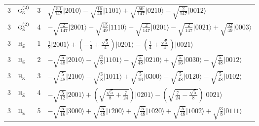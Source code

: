 \documentclass[11pt]{article}
\newcommand{\irr}[1]{\text{\normalfont\scshape #1}}
\newcommand{\ptag}[1]{\mathrm{#1}}
\newcommand{\occ}[1]{\lvert #1\rangle}
\begin{document}
\begin{longtable}{c l c p{}}
3 & $\irr{g}_{\ptag{g}}^{(2)}$ & 3 & $\sqrt{\tfrac{50}{147}}\occ{2010}-\sqrt{\tfrac{15}{49}}\occ{1101}+\sqrt{\tfrac{50}{147}}\occ{0210}-\sqrt{\tfrac{2}{147}}\occ{0012}$\\
3 & $\irr{g}_{\ptag{g}}^{(2)}$ & 4 & $-\sqrt{\tfrac{2}{147}}\occ{2001}-\sqrt{\tfrac{15}{49}}\occ{1110}-\sqrt{\tfrac{2}{147}}\occ{0201}-\sqrt{\tfrac{2}{147}}\occ{0021}+\sqrt{\tfrac{32}{49}}\occ{0003}$\\
3 & $\irr{h}_{\ptag{g}}$ & 1 & $\tfrac{1}{2}\occ{2001}+(- \frac{1}{4} + \frac{\sqrt{5}}{4})\occ{0201}-(\frac{1}{4} + \frac{\sqrt{5}}{4})\occ{0021}$\\
3 & $\irr{h}_{\ptag{g}}$ & 2 & $-\sqrt{\tfrac{5}{48}}\occ{2010}-\sqrt{\tfrac{3}{8}}\occ{1101}-\sqrt{\tfrac{5}{48}}\occ{0210}+\sqrt{\tfrac{5}{16}}\occ{0030}-\sqrt{\tfrac{5}{48}}\occ{0012}$\\
3 & $\irr{h}_{\ptag{g}}$ & 3 & $-\sqrt{\tfrac{5}{48}}\occ{2100}-\sqrt{\tfrac{3}{8}}\occ{1011}+\sqrt{\tfrac{5}{16}}\occ{0300}-\sqrt{\tfrac{5}{48}}\occ{0120}-\sqrt{\tfrac{5}{48}}\occ{0102}$\\
3 & $\irr{h}_{\ptag{g}}$ & 4 & $-\sqrt{\tfrac{5}{12}}\occ{2001}+(\sqrt{\frac{\sqrt{5}}{8} + \frac{7}{24}})\occ{0201}-(\sqrt{\frac{7}{24} - \frac{\sqrt{5}}{8}})\occ{0021}$\\
3 & $\irr{h}_{\ptag{g}}$ & 5 & $-\sqrt{\tfrac{5}{16}}\occ{3000}+\sqrt{\tfrac{5}{48}}\occ{1200}+\sqrt{\tfrac{5}{48}}\occ{1020}+\sqrt{\tfrac{5}{48}}\occ{1002}+\sqrt{\tfrac{3}{8}}\occ{0111}$\\
\hline
\end{longtable}
\end{document}

